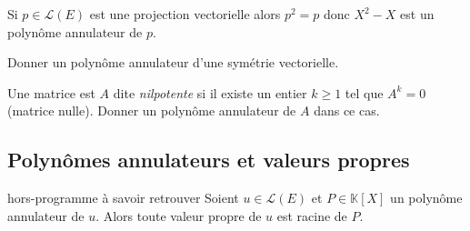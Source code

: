 \documentclass[french,11pt,twoside]{VcCours}
\begin{document}
\begin{Exemple}{} Si $p \in \mathcal{L}(E)$ est une projection vectorielle alors $p^2=p$ donc $X^2-X$ est un polynôme annulateur de $p$.
\end{Exemple}

\begin{ApplicationDirecte}{} Donner un polynôme annulateur d'une symétrie vectorielle.
\end{ApplicationDirecte}

\begin{ApplicationDirecte}{} Une matrice est $A$ dite \emph{nilpotente} si il existe un entier $k \geq 1$ tel que $A^k= 0$ (matrice nulle). Donner un polynôme annulateur de $A$ dans ce cas.
\end{ApplicationDirecte}

\subsection{Polynômes annulateurs et valeurs propres}

\begin{Proposition}{hors-programme à savoir retrouver} Soient $u \in \mathcal{L}(E)$ et $P \in \mathbb{K}[X]$ un polynôme annulateur de $u$. Alors toute valeur propre de $u$ est racine de $P$. 
\end{Proposition}

\begin{Demonstration}{} 

\vspace{7cm}
 \end{Demonstration}
 
\end{document}
